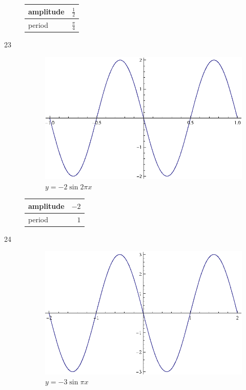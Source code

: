 \documentclass{exam}
\begin{document}
\begin{description}
        \begin{tabular}[H]{lr}
          \toprule
          amplitude & $\frac{1}{2}$ \\
          \midrule
          period & $\frac{\pi}{4}$ \\
          \bottomrule
        \end{tabular}

      \item[23]
        \begin{figure}[H]
          \centering
          \includegraphics[scale=0.9]{exercise23.eps}
          \caption{$y = -2 \sin 2 \pi x$}
        \end{figure}

        \begin{tabular}[H]{lr}
          \toprule
          amplitude & $-2$ \\
          \midrule
          period & $1$ \\
          \bottomrule
        \end{tabular}

      \item[24]
        \begin{figure}[H]
          \centering
          \includegraphics[scale=0.9]{exercise24.eps}
          \caption{$y = -3 \sin \pi x$}
        \end{figure}


\end{description}
\end{document}
